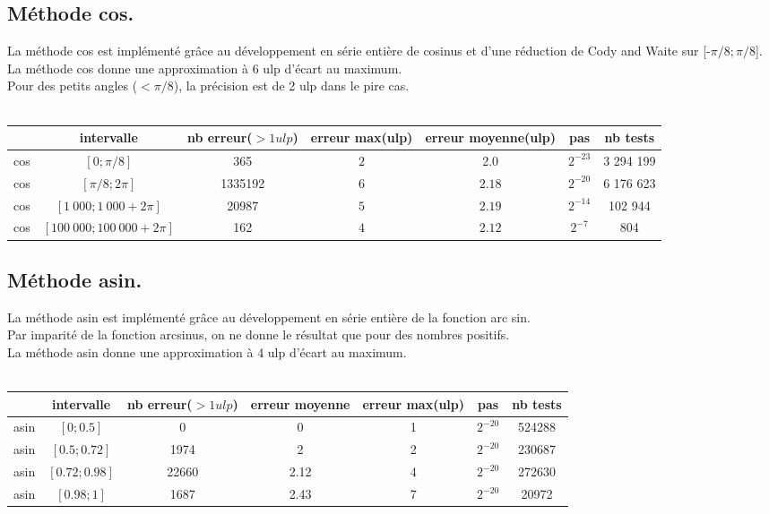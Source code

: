 \documentclass[a4,12pt]{article}
\begin{document}
\subsection{Méthode cos.}
La méthode cos est implémenté grâce au développement en série entière de cosinus et d'une réduction de Cody and Waite sur [-$\pi /8;\pi /8$].\\
La méthode cos donne une approximation à 6 ulp d'écart au maximum.\\
Pour des petits angles ($<\pi /8$), la précision est de 2 ulp dans le pire cas.\\
\\

\hspace{-4cm}\begin{tabular}{|c|c|c|c|c|c|c|}

\hline 
 & intervalle & nb erreur($>1 ulp$) & erreur max(ulp)& erreur moyenne(ulp) & pas & nb tests \\
\hline 
cos & $[0; \pi /8]$             & 365      & $2$ & 2.0        &$2^{-23}$ & 3 294 199\\
\hline 
cos & $[\pi /8; 2\pi]$          & 1335192 & $6$ &$2.18$ & $2^{-20}$ & 6 176 623\\
\hline 
cos & $[1\ 000; 1\ 000 + 2\pi]$     & 20987    & $5$ &$2.19$ & $2^{-14}$ & 102 944\\
\hline 
cos & $[100\ 000; 100\ 000 + 2\pi]$ & 162     & $4$ &$ 2.12$ & $2^{-7}$ & 804\\
\hline
\end{tabular}

\subsection{Méthode asin.}
La méthode asin est implémenté grâce au développement en série entière de la fonction arc sin.\\
Par imparité de la fonction arcsinus, on ne donne le résultat que pour des nombres positifs.\\
La méthode asin donne une approximation à 4 ulp d'écart au maximum.\\
\\

\hspace{-3cm}
\begin{tabular}{|c|c|c|c|c|c|c|}
\hline
 & intervalle & nb erreur($>1 ulp$) & erreur moyenne & erreur max(ulp) & pas & nb tests \\
\hline
asin & $[0;0.5]$ & 0 & 0 & 1 &$2^{-20}$ & 524288\\
\hline
asin & $[0.5;0.72]$ & 1974 & 2 & 2 & $2^{-20}$ & 230687\\
\hline
asin & $[0.72;0.98]$ & 22660 & 2.12 & 4 & $2^{-20}$ & 272630\\
\hline
asin & $[0.98;1]$ & 1687 & 2.43 & 7 & $2^{-20}$ & 20972\\
\hline
\end{tabular}
\end{document}
